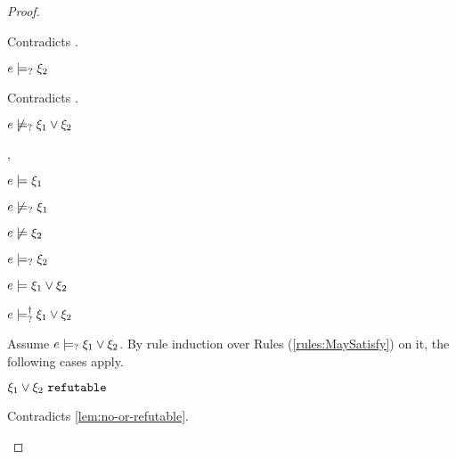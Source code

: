 \begin{proof}
\begin{byCases}
\begin{byCases}
\begin{byCases}
            Contradicts .
        \item[\text{(\ref{rule:CMSOr2})}]
            \begin{pfsteps*}
            \item $e \models_{?} \xi_2$ 
            \end{pfsteps*}
            Contradicts .
        \end{byCases}
        \begin{pfsteps*}
        \item $e \not\models_{?} \xi_1 \vee \xi_2$ 
        \end{pfsteps*}
        
    \item[\csatisfy{e}{\xi_1},\cmaysatisfy{e}{\xi_2}]
        \begin{pfsteps*}
        \item $e \models \xi_1$  
        \item $e \not\models_{?} \xi_1$  
        \item $e \not\models \xi_2$  
        \item $e \models_{?} \xi_2$  
        \item $e \models \xi_1 \vee \xi_2$  
        \item $e \models_{?}^{\dag} \xi_1 \vee \xi_2$ 
        \end{pfsteps*}
        Assume $e \models_{?} \xi_1 \vee \xi_2$. By rule induction over Rules (\ref{rules:MaySatisfy}) on it, the following cases apply.
        \begin{byCases}
        \item[\text{(\ref{rule:CMSNotVal})}]
            \begin{pfsteps*}
            \item $\xi_1 \vee \xi_2 ~\mathtt{refutable}$ 
            \end{pfsteps*}
            Contradicts \autoref{lem:no-or-refutable}.
        \item[\text{(\ref{rule:CMSOr1})}]
            \begin{pfsteps*}

\end{pfsteps*}
\end{byCases}
\end{byCases}
\end{byCases}
\end{proof}
